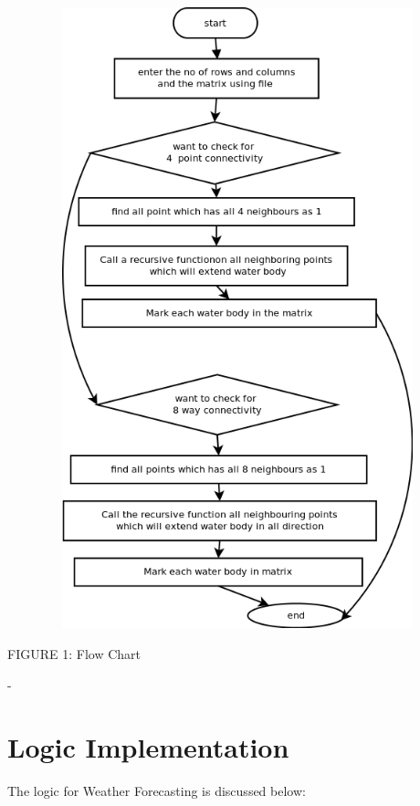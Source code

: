 \documentclass [12 pt ]{article}
\begin{document}
\begin{center}
\vspace{1cm}
\includegraphics[height=18cm, width=15cm]{flowchart.png}

FIGURE 1: Flow Chart 
\end{center}-
\newpage
 
\section{Logic Implementation}
 The logic for Weather Forecasting is discussed below:
 
\end{document}
